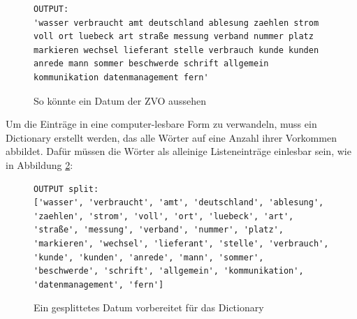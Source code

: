 \documentclass[german,version-2020-11]{uzl-thesis}
\begin{document}
\begin{figure}[h]
\begin{lstlisting}
OUTPUT: 
'wasser verbraucht amt deutschland ablesung zaehlen strom voll ort luebeck art straße messung verband nummer platz markieren wechsel lieferant stelle verbrauch kunde kunden anrede mann sommer beschwerde schrift allgemein kommunikation datenmanagement fern'
\end{lstlisting}
\caption{So könnte ein Datum der ZVO aussehen} 
\label{fig:data1}
\end{figure}

Um die Einträge in eine computer-lesbare Form zu verwandeln, muss ein Dictionary erstellt werden, das alle Wörter auf eine Anzahl ihrer Vorkommen abbildet. Dafür müssen die Wörter als alleinige Listeneinträge einlesbar sein, wie in Abbildung \ref{fig:data2}: 

\begin{figure}[h]
\begin{lstlisting}
OUTPUT split: 
['wasser', 'verbraucht', 'amt', 'deutschland', 'ablesung', 'zaehlen', 'strom', 'voll', 'ort', 'luebeck', 'art', 'straße', 'messung', 'verband', 'nummer', 'platz', 'markieren', 'wechsel', 'lieferant', 'stelle', 'verbrauch', 'kunde', 'kunden', 'anrede', 'mann', 'sommer', 'beschwerde', 'schrift', 'allgemein', 'kommunikation', 'datenmanagement', 'fern']
\end{lstlisting}
\caption{Ein gesplittetes Datum vorbereitet für das Dictionary}
\label{fig:data2}
\end{figure}
\end{document}
